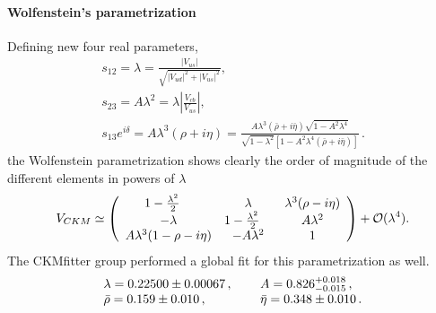 \paragraph*{Wolfenstein's parametrization}
Defining new four real parameters, 
\begin{gather}
    s_{12}=\lambda={\frac{|V_{u s}|}{\sqrt{|V_{u d}|^{2}+|V_{u s}|^{2}}}} ,\\
    s_{23}=A\lambda^{2}=\lambda|\frac{V_{c b}}{V_{u s}}|,\\
    s_{13}e^{i\delta}=A\lambda^{3}(\rho+i\eta)=\frac{A\lambda^{3}(\bar{\rho}+i\bar{\eta})\sqrt{1-A^{2}\lambda^{4}}}{\sqrt{1-\lambda^{2}}\left[1-A^{2}\lambda^{4}(\bar{\rho}+i\bar{\eta})\right]}\,
.
\end{gather}
the Wolfenstein parametrization shows clearly the order of magnitude of the different elements in powers of $\lambda$
\begin{equation}
    V_{C K M}\simeq\left(\begin{array}{c c c}{{1-\frac{\lambda^{2}}2\ \ \ }}&{{\lambda}}&{{\lambda^{3}(\rho-i\eta)}}\\ {{-\lambda}}&{{1-\frac{\lambda^{2}}2\ \ \ }}&{{A\lambda^{2}}}\\ {{A\lambda^{3}(1-\rho-i\eta)}}&{{-A\lambda^{2}}}&{{1}}\end{array}\right)+{\cal O}(\lambda^{4}).
\end{equation}
The CKMfitter group performed a global fit for this parametrization as well.
\begin{equation}
    \begin{array}{l l}{{\lambda=0.22500\pm0.00067\,,~~~~}}&{{A=0.826_{-0.015}^{+0.018}\,,}}\\ {{\bar{\rho}=0.159\pm0.010\,{,~~~}}}&{{\bar{\eta}=0.348\pm0.010\,.}}\end{array}
\end{equation}
